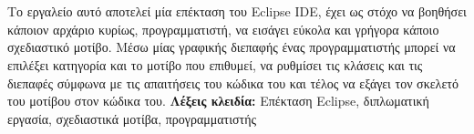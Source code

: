 \chapter*{\abstractname}
\addstarredchapter{\abstractname} %
\makecseabstract

Το εργαλείο αυτό αποτελεί μία επέκταση του Eclipse IDE, έχει ως στόχο να βοηθήσει κάποιον αρχάριο κυρίως, προγραμματιστή, 
να εισάγει εύκολα και γρήγορα κάποιο σχεδιαστικό μοτίβο. Μέσω μίας γραφικής διεπαφής
ένας προγραμματιστής μπορεί να επιλέξει κατηγορία και το μοτίβο
που επιθυμεί, να ρυθμίσει τις κλάσεις και τις διεπαφές σύμφωνα με
τις απαιτήσεις του κώδικα του και τέλος να εξάγει τον σκελετό του 
μοτίβου στον κώδικα του. 
\linebreak
\linebreak
\textbf{Λέξεις κλειδία:} Επέκταση Eclipse, 
διπλωματική εργασία, σχεδιαστικά μοτίβα, προγραμματιστής
